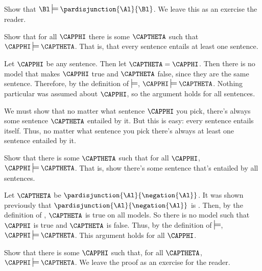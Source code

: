 \begin{majorILnc}{}
Show that $\Bl\sdtstile{}{}\pardisjunction{\Al}{\Bl}$. We leave this as an exercise the reader.
\end{majorILnc}
\begin{majorILnc}{}
Show that for all $\CAPPHI$ there is some $\CAPTHETA$ such that $\CAPPHI\sdtstile{}{}\CAPTHETA$. That is, that every \GSL{} sentence entails at least one \GSL{} sentence.
\end{majorILnc}
\begin{PROOF}
	Let $\CAPPHI$ be any \GSL{} sentence.
	Then let $\CAPTHETA=\CAPPHI$.
	Then there is no model that makes $\CAPPHI$ true and $\CAPTHETA$ false, since they are the same sentence.
	Therefore, by the definition of $\sdtstile{}{}$, $\CAPPHI\sdtstile{}{}\CAPTHETA$.
	Nothing particular was assumed about $\CAPPHI$, so the argument holds for all \GSL{} sentences.
\end{PROOF}
\begin{commentary}
	We must show that no matter what \GSL{} sentence $\CAPPHI$ you pick, there's always some \GSL{} sentence $\CAPTHETA$ entailed by it.
	But this is easy: every \GSL{} sentence entails itself.
	Thus, no matter what \GSL{} sentence you pick there's always at least one sentence entailed by it.
\end{commentary}

\begin{majorILnc}{}
Show that there is some $\CAPTHETA$ such that for all $\CAPPHI$, $\CAPPHI\sdtstile{}{}\CAPTHETA$. That is, show there's some \GSL{} sentence that's entailed by all \GSL{} sentences.
\end{majorILnc}
\begin{PROOF}
	Let $\CAPTHETA$ be $\pardisjunction{\Al}{\negation{\Al}}$. 
	It was shown previously that $\pardisjunction{\Al}{\negation{\Al}}$ is .
	Then, by the definition of , $\CAPTHETA$ is true on all models.
	So there is no model such that $\CAPPHI$ is true and $\CAPTHETA$ is false.
	Thus, by the definition of $\sdtstile{}{}$, $\CAPPHI\sdtstile{}{}\CAPTHETA$.
	This argument holds for all $\CAPPHI$.
\end{PROOF}

\begin{majorILnc}{}
Show that there is some $\CAPPHI$ such that, for all $\CAPTHETA$, $\CAPPHI\sdtstile{}{}\CAPTHETA$. We leave the proof as an exercise for the reader.
\end{majorILnc}

